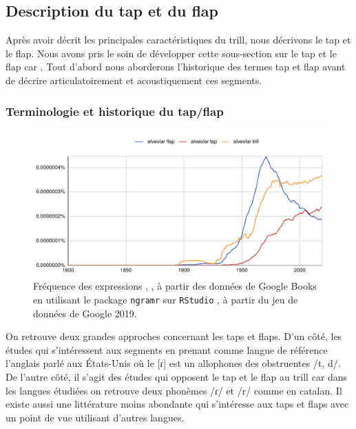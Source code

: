 \subsection{Description du tap et du flap}

Après avoir décrit les principales caractéristiques du trill, nous décrivons le tap et le flap. Nous avons pris le soin de développer cette sous-section sur le tap et le flap car . Tout d'abord nous aborderons l'historique des termes tap et flap avant de décrire articulatoirement et acoustiquement ces segments.

\subsubsection{Terminologie et historique du tap/flap}

\begin{figure}
	\centering
	\includegraphics[width=1\linewidth]{images/google_ngram_trill_tap_flap}
	\caption[Google n-grams de , , ]{Fréquence des expressions , ,  à partir des données de Google Books en utilisant le package \texttt{ngramr} sur \texttt{RStudio} \parencite{rcoreteamLanguageEnvironmentStatistical2020}, à partir du jeu de données de Google 2019.}
	\label{fig:googlengramtrilltapflap}
\end{figure}


On retrouve deux grandes approches concernant les taps et flaps. D'un côté, les études qui s'intéressent aux segments en prenant comme langue de référence l'anglais parlé aux États-Unis où le [ɾ] est un allophones des obstruentes /t, d/. De l'autre côté, il s'agit des études qui opposent le tap et le flap au trill car dans les langues étudiées on retrouve deux phonèmes /ɾ/ et /r/ comme en catalan. Il existe aussi une littérature moins abondante qui s'intéresse aux taps et flaps avec un point de vue utilisant d'autres langues.\\

